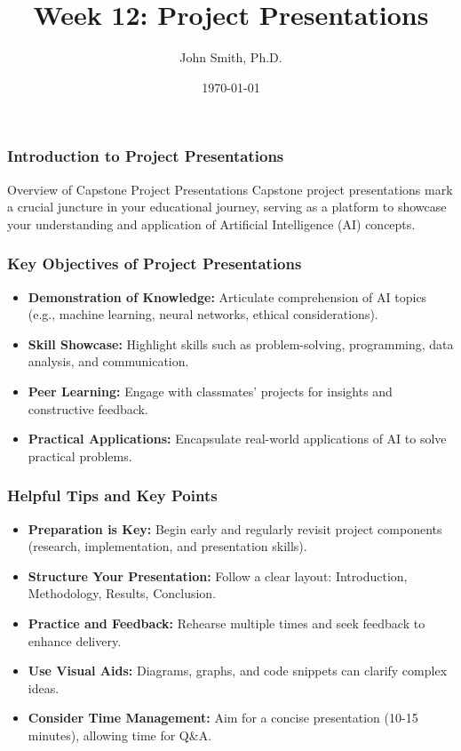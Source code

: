 \documentclass[aspectratio=169]{beamer}
\title[Week 12: Project Presentations]{Week 12: Project Presentations}
\author[J. Smith]{John Smith, Ph.D.}
\institute[University Name]{
  Department of Computer Science\\
  University Name\\
  \vspace{0.3cm}
  Email: email@university.edu\\
  Website: www.university.edu
}
\date{\today}
\begin{document}
\frame{\titlepage}

\begin{frame}[fragile]
    \frametitle{Introduction to Project Presentations}
    \begin{block}{Overview of Capstone Project Presentations}
        Capstone project presentations mark a crucial juncture in your educational journey, serving as a platform to showcase your understanding and application of Artificial Intelligence (AI) concepts.
    \end{block}
\end{frame}

\begin{frame}[fragile]
    \frametitle{Key Objectives of Project Presentations}
    \begin{itemize}
        \item \textbf{Demonstration of Knowledge:} Articulate comprehension of AI topics (e.g., machine learning, neural networks, ethical considerations).
        \item \textbf{Skill Showcase:} Highlight skills such as problem-solving, programming, data analysis, and communication.
        \item \textbf{Peer Learning:} Engage with classmates’ projects for insights and constructive feedback.
        \item \textbf{Practical Applications:} Encapsulate real-world applications of AI to solve practical problems.
    \end{itemize}
\end{frame}

\begin{frame}[fragile]
    \frametitle{Helpful Tips and Key Points}
    \begin{itemize}
        \item \textbf{Preparation is Key:} Begin early and regularly revisit project components (research, implementation, and presentation skills).
        \item \textbf{Structure Your Presentation:} Follow a clear layout: Introduction, Methodology, Results, Conclusion.
        \item \textbf{Practice and Feedback:} Rehearse multiple times and seek feedback to enhance delivery.
        \item \textbf{Use Visual Aids:} Diagrams, graphs, and code snippets can clarify complex ideas.
        \item \textbf{Consider Time Management:} Aim for a concise presentation (10-15 minutes), allowing time for Q\&A.
    \end{itemize}
\end{frame}
\end{document}
